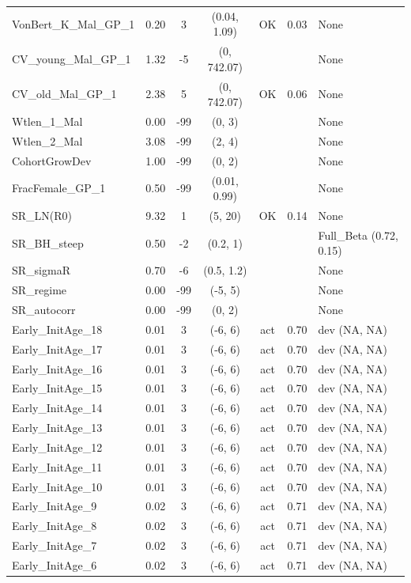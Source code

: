 \documentclass[12pt,]{article}
\begin{document}
\begin{landscape}
\begin{longtable}{lrcccll}
  VonBert\_K\_Mal\_GP\_1 & 0.20 & 3 & (0.04, 1.09) & OK & 0.03 & None \\ 
  CV\_young\_Mal\_GP\_1 & 1.32 & -5 & (0, 742.07) &  &  & None \\ 
  CV\_old\_Mal\_GP\_1 & 2.38 & 5 & (0, 742.07) & OK & 0.06 & None \\ 
  Wtlen\_1\_Mal & 0.00 & -99 & (0, 3) &  &  & None \\ 
  Wtlen\_2\_Mal & 3.08 & -99 & (2, 4) &  &  & None \\ 
  CohortGrowDev & 1.00 & -99 & (0, 2) &  &  & None \\ 
  FracFemale\_GP\_1 & 0.50 & -99 & (0.01, 0.99) &  &  & None \\ 
  SR\_LN(R0) & 9.32 & 1 & (5, 20) & OK & 0.14 & None \\ 
  SR\_BH\_steep & 0.50 & -2 & (0.2, 1) &  &  & Full\_Beta (0.72, 0.15) \\ 
  SR\_sigmaR & 0.70 & -6 & (0.5, 1.2) &  &  & None \\ 
  SR\_regime & 0.00 & -99 & (-5, 5) &  &  & None \\ 
  SR\_autocorr & 0.00 & -99 & (0, 2) &  &  & None \\ 
  Early\_InitAge\_18 & 0.01 & 3 & (-6, 6) & act & 0.70 & dev (NA, NA) \\ 
  Early\_InitAge\_17 & 0.01 & 3 & (-6, 6) & act & 0.70 & dev (NA, NA) \\ 
  Early\_InitAge\_16 & 0.01 & 3 & (-6, 6) & act & 0.70 & dev (NA, NA) \\ 
  Early\_InitAge\_15 & 0.01 & 3 & (-6, 6) & act & 0.70 & dev (NA, NA) \\ 
  Early\_InitAge\_14 & 0.01 & 3 & (-6, 6) & act & 0.70 & dev (NA, NA) \\ 
  Early\_InitAge\_13 & 0.01 & 3 & (-6, 6) & act & 0.70 & dev (NA, NA) \\ 
  Early\_InitAge\_12 & 0.01 & 3 & (-6, 6) & act & 0.70 & dev (NA, NA) \\ 
  Early\_InitAge\_11 & 0.01 & 3 & (-6, 6) & act & 0.70 & dev (NA, NA) \\ 
  Early\_InitAge\_10 & 0.01 & 3 & (-6, 6) & act & 0.70 & dev (NA, NA) \\ 
  Early\_InitAge\_9 & 0.02 & 3 & (-6, 6) & act & 0.71 & dev (NA, NA) \\ 
  Early\_InitAge\_8 & 0.02 & 3 & (-6, 6) & act & 0.71 & dev (NA, NA) \\ 
  Early\_InitAge\_7 & 0.02 & 3 & (-6, 6) & act & 0.71 & dev (NA, NA) \\ 
  Early\_InitAge\_6 & 0.02 & 3 & (-6, 6) & act & 0.71 & dev (NA, NA) \\ 

\end{longtable}
\end{landscape}
\end{document}
